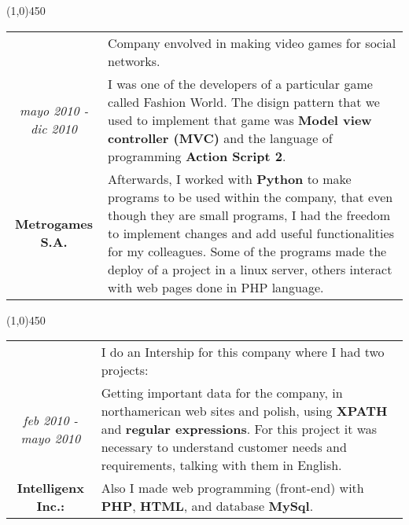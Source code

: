 \begin{center}
\line(1,0){450}
\end{center}
\noindent
\begin{tabular}{c|p{12.5cm}}
& \large Company envolved in making video games for social networks. \\
\large\textit{mayo 2010 - dic 2010} &  \large I was one of the developers of a particular game called Fashion World. The disign pattern that we used to implement that game was \textbf{Model view controller (MVC)} and the language of programming \textbf{Action Script 2}.\\
\large\textbf{Metrogames S.A.} & \large Afterwards, I worked with \textbf{Python} to make programs to be used within the company, that even though they are small programs, I had the freedom to implement changes and add useful functionalities for my colleagues. Some of the programs made the deploy of a project in a linux server, others interact with web pages done in PHP language.
\end{tabular}

\begin{center}
\line(1,0){450}
\end{center}
\noindent
\begin{tabular}{c|p{12.5cm}}
& \large I do an Intership for this company where I had two projects:\\
\large\textit{feb 2010 - mayo 2010} & \large Getting important data for the company, in northamerican web sites and polish, using \textbf{XPATH} and \textbf{regular expressions}.  For this project it was necessary to understand customer needs and requirements, talking with them in English.\\
\large\textbf{Intelligenx Inc.:} & \large Also I made web programming (front-end) with \textbf{PHP}, \textbf{HTML}, and database \textbf{MySql}.
\end{tabular}

